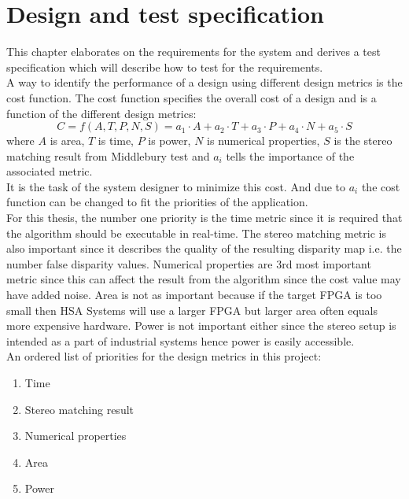 \chapter{Design and test specification} \label{ch:req}
This chapter elaborates on the requirements for the system and derives a test specification which will describe how to test for the requirements.\\

A way to identify the performance of a design using different design metrics is the cost function. The cost function specifies the overall cost of a design and is a function of the different design metrics:
\begin{equation}
C = f(A,T,P,N,S) = a_1\cdot A + a_2 \cdot T + a_3 \cdot P + a_4 \cdot N + a_5 \cdot S
\end{equation}
where $A$ is area, $T$ is time, $P$ is power, $N$ is numerical properties, $S$ is the stereo matching result from Middlebury test and $a_i$ tells the importance of the associated metric.\\
It is the task of the system designer to minimize this cost. And due to $a_i$ the cost function can be changed to fit the priorities of the application.\\

For this thesis, the number one priority is the time metric since it is required that the algorithm should be executable in real-time. The stereo matching metric is also important since it describes the quality of the resulting disparity map i.e. the number false disparity values. Numerical properties are 3rd most important metric since this can affect the result from the algorithm since the cost value may have added noise. Area is not as important because if the target FPGA is too small then HSA Systems will use a larger FPGA but larger area often equals more expensive hardware. Power is not important either since the stereo setup is intended as a part of industrial systems hence power is easily accessible.\\

An ordered list of priorities for the design metrics in this project:
\begin{multicols}{2}
  \begin{enumerate}
    \item Time
    \item Stereo matching result
    \item Numerical properties
    \item Area 
    \item Power\\~\\
  \end{enumerate}
\end{multicols}

